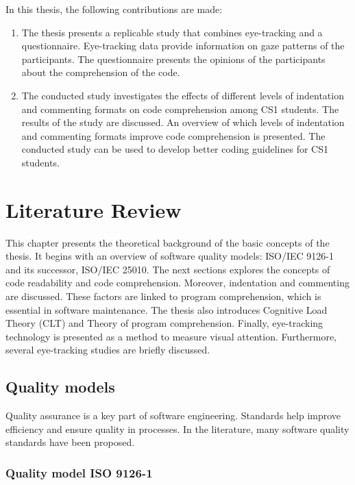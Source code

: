 In this thesis, the following contributions are made:
\begin{enumerate}

\item The thesis presents a replicable study that combines eye-tracking and a questionnaire. Eye-tracking data provide information on gaze patterns of the participants. The questionnaire presents the opinions of the participants about the comprehension of the code.

\item  The conducted study investigates the effects of different levels of indentation and commenting formats on code comprehension among CS1 students. The results of the study are discussed. An overview of which levels of indentation and commenting formats improve code comprehension is presented. The conducted study can be used to develop better coding guidelines for CS1 students.

\end{enumerate}

\chapter{Literature Review}
This chapter presents the theoretical background of the basic concepts of the thesis. It begins with an overview of software quality models: ISO/IEC 9126-1 and its successor, ISO/IEC 25010. The next sections explores the concepts of code readability and code comprehension. Moreover, indentation and commenting are discussed. These factors are linked to program comprehension, which is essential in software maintenance. The thesis also introduces Cognitive Load Theory (CLT) and Theory of program comprehension. Finally,  eye-tracking technology is presented as a method to measure visual attention. Furthermore, several eye-tracking studies are briefly discussed. 



\section{Quality models}
Quality assurance is a key part of software engineering. Standards help improve efficiency and ensure quality in  processes. In the literature, many software quality standards have been proposed.

 

\subsection{Quality model ISO 9126-1}

